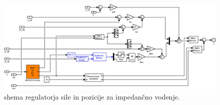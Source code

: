 \begin{figure}[!h]
	\centering
	\includegraphics[width=\textwidth]{./Slike/impedance_control.eps}
	\caption{\simulink shema regulatorja sile in pozicije za impedan\v{c}no vodenje.}
	\label{fig:impedance_control_sim}
\end{figure}
